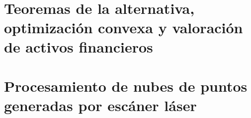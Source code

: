 \documentclass[a4paper,11pt]{book}
\begin{document}
	
\tableofcontents
%





\\

\part{Teoremas de la alternativa, optimización convexa y valoración de activos financieros}
%
%

%
%

%
%
%

%
%
%

\part{Procesamiento de nubes de puntos generadas por escáner láser}












\end{document}
